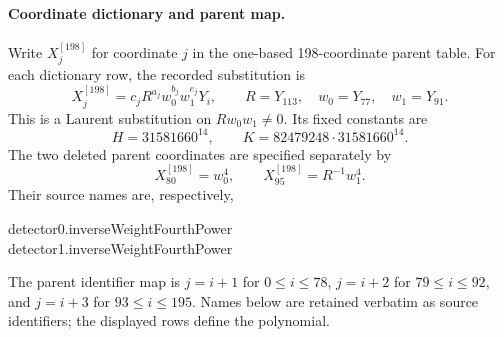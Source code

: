 \paragraph{Coordinate dictionary and parent map.}
Write $X_j^{[198]}$ for coordinate $j$ in the one-based 198-coordinate
parent table. For each dictionary row, the recorded substitution is
\[
X_j^{[198]}=c_jR^{a_j}w_0^{b_j}w_1^{e_j}Y_i,
\qquad R=Y_{113},\quad w_0=Y_{77},\quad w_1=Y_{91}.
\]
This is a Laurent substitution on $Rw_0w_1\ne0$. Its fixed constants are
\[
H=31581660^{14},\qquad K=82479248\cdot31581660^{14}.
\]
The two deleted parent coordinates are specified separately by
\[
X_{80}^{[198]}=w_0^{4},\qquad X_{95}^{[198]}=R^{-1}w_1^{4}.
\]
Their source names are, respectively,
\begin{center}\small\ttfamily
detector0.inverseWeightFourthPower\\
detector1.inverseWeightFourthPower
\end{center}
The parent
identifier map is $j=i+1$ for $0\le i\le78$, $j=i+2$ for $79\le i\le92$,
and $j=i+3$ for $93\le i\le195$. Names below are retained verbatim
as source identifiers; the displayed rows define the polynomial.
